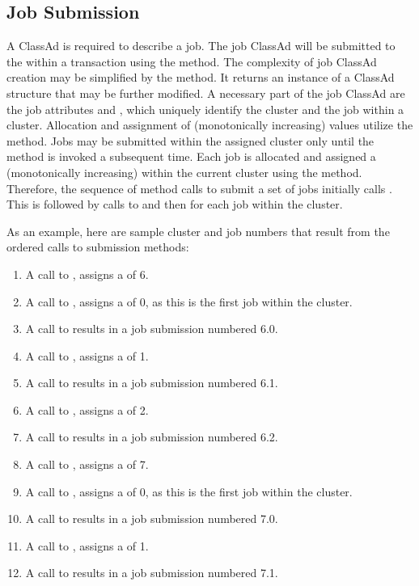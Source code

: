 \subsection{\label{WebService-JobSubmission} Job Submission}

A ClassAd is required to describe a job.
The job ClassAd will be 
submitted to the  within a transaction
using the  method.
The complexity of job ClassAd creation may be simplified
by the  method.
It returns an instance of a ClassAd structure that may be
further modified.
A necessary part of the job ClassAd are the job attributes
 and , which uniquely identify
the cluster and the job within a cluster.
Allocation and assignment of (monotonically increasing)
 values utilize the  method.
Jobs may be submitted within the assigned cluster only until
the  method is invoked a subsequent time. 
Each job is allocated and assigned a (monotonically increasing)
 within the current cluster using the 
method.
Therefore, the sequence of method calls to submit a set of jobs
initially calls .
This is followed by calls to  and then 
for each job within the cluster.

As an example, here are sample cluster and job numbers that 
result from the ordered calls to submission methods:
\begin{enumerate}
 \item
 A call to , assigns a  of 6.
 \item
 A call to , assigns a  of 0, as
 this is the first job within the cluster.
 \item
 A call to  results in a job submission numbered 6.0.
 \item
 A call to , assigns a  of 1.
 \item
 A call to  results in a job submission numbered 6.1.
 \item
 A call to , assigns a  of 2.
 \item
 A call to  results in a job submission numbered 6.2.
 \item
 A call to , assigns a  of 7.
 \item
 A call to , assigns a  of 0, as
 this is the first job within the cluster.
 \item
 A call to  results in a job submission numbered 7.0.
 \item
 A call to , assigns a  of 1.
 \item
 A call to  results in a job submission numbered 7.1.
\end{enumerate}


